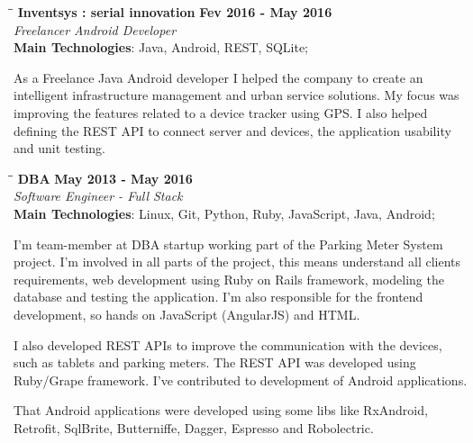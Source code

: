 \documentclass[margin]{res}
\begin{document}
\begin{resume}
\vspace{-0.1in}
   \begin{tabbing}
   \hspace{2.3in}\= \hspace{1.7in}\= \kill %
    \textbf{Inventsys : serial innovation}    \>\>\textbf{Fev 2016 - May 2016}\\
    \textit{Freelancer Android Developer}\\
    \textbf{Main Technologies}: Java, Android, REST, SQLite;
   \end{tabbing}\vspace{-20pt}      %
    \vspace{2mm}
As a Freelance Java Android developer I helped the company to create an intelligent infrastructure management and urban service solutions. My focus was improving the features related to a device tracker using GPS. I also helped defining the REST API to connect server and devices, the application usability and unit testing.



\vspace{-0.1in}
   \begin{tabbing}
   \hspace{2.3in}\= \hspace{1.7in}\= \kill %
    \textbf{DBA}    \>\>\textbf{May 2013 - May 2016}\\
    \textit{Software Engineer - Full Stack}\\
    \textbf{Main Technologies}: Linux, Git, Python, Ruby, JavaScript, Java, Android;
   \end{tabbing}\vspace{-20pt}      %
    \vspace{2mm}
I'm team-member at DBA startup working part of the Parking Meter System project. I'm involved in all parts of the project, this means understand all clients requirements, web development using Ruby on Rails framework, modeling the database and testing the application. I'm also responsible for the frontend development, so hands on JavaScript (AngularJS) and HTML.

I also developed REST APIs to improve the communication with the devices, such as tablets and parking meters. The REST API was developed using Ruby/Grape framework. I've contributed to development of Android applications.

That Android applications were developed using some libs like RxAndroid, Retrofit, SqlBrite, Butterniffe, Dagger, Espresso and Robolectric.


\end{resume}
\end{document}
